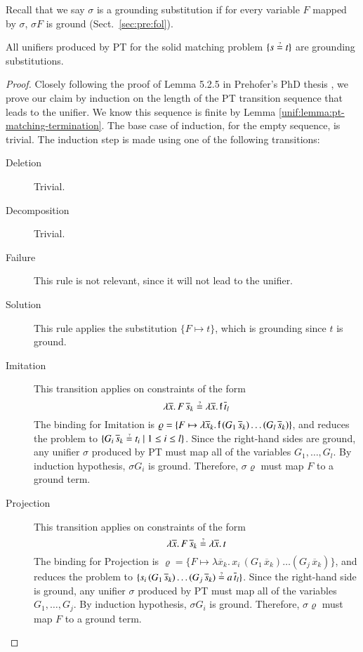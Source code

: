 Recall that we say $\sigma$ is a grounding substitution if for every variable $F$ mapped
by $\sigma$, $\sigma F$ is ground (Sect.~\ref{sec:pre:fol}).
\begin{lemma}
    \label{unif:lemma:pt-matching-ground}
  All unifiers produced by PT for the solid matching problem $\{s \unif t\}$ are grounding substitutions.
\end{lemma}
\begin{proof}
  Closely following the proof of Lemma 5.2.5 in Prehofer's PhD thesis
  \cite{cp-95-unifphd}, we prove our claim by induction on the length of the
  PT transition sequence that leads to the unifier. We know this
  sequence is finite by Lemma \ref{unif:lemma:pt-matching-termination}. The base case of
  induction, for the empty sequence, is trivial. The induction step is made using
  one of the following transitions:

  \begin{description}
    \item[Deletion] Trivial.
    \item[Decomposition] Trivial.
    \item[Failure] This rule is not relevant, since it will not lead to the unifier.
    \item[Solution] This rule applies the substitution $\{F \mapsto t\}$, which 
    is grounding since $t$ is ground.
    \item[Imitation] This transition applies on 
    constraints of the form
    \[ \lambda \overline{x}. \, F \, \overline{s}_k \unif \lambda
    \overline{x}. \, \cst{f} \, \overline{t}_l \]
    The binding for \textsf{Imitation} is
    $\varrho = \{F \mapsto \lambda \overline{x}_k.\, \mathsf{f}\, (G_1 \,
    \overline{s}_k ) \ldots (G_l \, \overline{s}_k ) \}$, and reduces the
    problem to $\{G_i \,  \overline{s}_k \unif t_i \mid 1\le i\le l\}$. Since the right-hand sides are ground, 
    any unifier $\sigma$ produced by PT must map all of the variables $G_1, \ldots, G_l$. By induction hypothesis,
    $\sigma G_i$ is ground. Therefore, $\sigma\varrho$ must map $F$ to a ground term.
    \item[Projection] This transition applies on 
    constraints of the form 
    \[\lambda \overline{x}. \, F \, \overline{s}_k \unif \lambda
    \overline{x}. \, t\]
    The binding for \textsf{Projection} is
    $\varrho = \{F \mapsto \lambda \overline{x}_k. \, x_i \, (G_1 \,
      \overline{x}_k) \ldots (G_j \, \overline{x}_k)\}$,
    and reduces the problem to
    $\{s_i \, (G_1 \,
      \overline{s}_k) \ldots (G_j \, \overline{s}_k) \unif a \, \overline{t}_l\}$.
      Since the right-hand side is ground, 
      any unifier $\sigma$ produced by PT must map all of the variables $G_1, \ldots, G_j$. 
    By induction hypothesis,
    $\sigma G_i$ is ground. Therefore, $\sigma\varrho$ must map $F$ to a ground term. \qedhere
  \end{description}
\end{proof}

